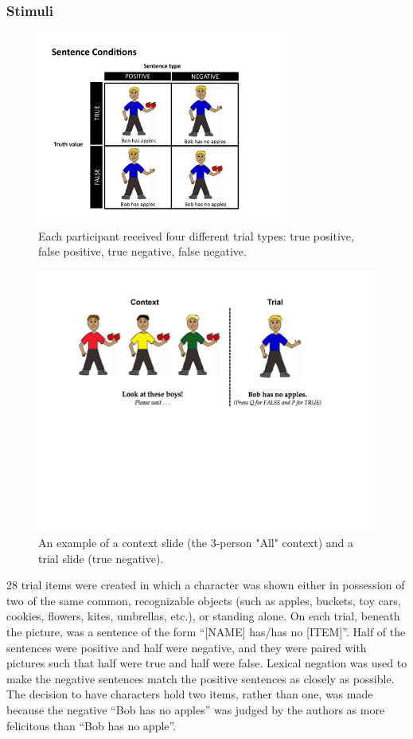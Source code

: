 \documentclass[10pt,letterpaper]{article}
\begin{document}
\subsubsection{Stimuli}
\begin{figure}[t]
\begin{center} 
\includegraphics[width=3.25in]{figures/negatron_trialfig.pdf}
\caption{\label{fig:addition_subs} Each participant received four different trial types: true positive, false positive, true negative, false negative. }
\end{center} 
\end{figure}

\begin{figure}[t]
\begin{center} 
\includegraphics[width=3.25inn]{figures/negatron_trialfig2.pdf}
\caption{\label{fig:addition_subs} An example of a context slide (the 3-person "All" context) and a trial slide (true negative). }
\vspace{-5mm}
\end{center} 
\end{figure}

28 trial items were created in which a character was shown either in possession of two of the same common, recognizable objects (such as apples, buckets, toy cars, cookies, flowers, kites, umbrellas, etc.), or standing alone.  On each trial, beneath the picture, was a sentence of the form ``[NAME] has/has no [ITEM]''.  Half of the sentences were positive and half were negative, and they were paired with pictures such that half were true and half were false.  Lexical negation was used to make the negative sentences match the positive sentences as closely as possible.  The decision to have characters hold two items, rather than one, was made because the negative ``Bob has no apples'' was judged by the authors as more felicitous than ``Bob has no apple''.  
\end{document}
